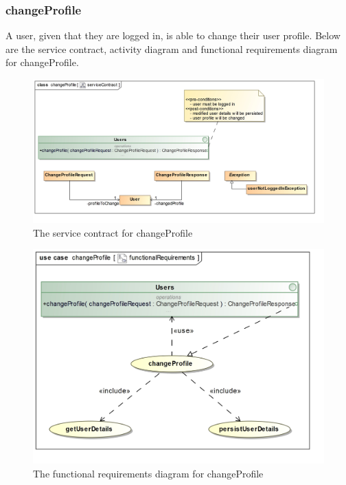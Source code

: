 \subsubsection{changeProfile}

A user, given that they are logged in, is able to change their user profile. Below are the service contract, activity diagram and functional requirements diagram for changeProfile.

\begin{figure}[H]
	\centering
	\includegraphics[scale=0.22]{../images/funcReq/changeProfileServiceContract.jpg}
	\caption{The service contract for changeProfile \label{overflow}}
\end{figure}

\begin{figure}[H]
	\centering
	\includegraphics[width=1.1\textwidth]{../images/funcReq/changeProfileFunctionalRequirements.jpg}
	\caption{The functional requirements diagram for changeProfile \label{overflow}}
\end{figure}

